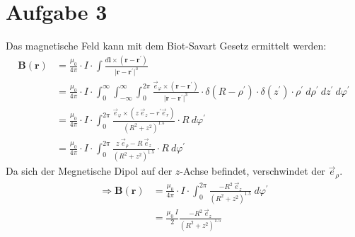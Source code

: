 \documentclass[11pt a4paper]{article}
\begin{document}
\newpage
\setlength{\headheight}{0cm}
\section*{Aufgabe 3}
Das magnetische Feld kann mit dem Biot-Savart Gesetz ermittelt werden:
\begin{align*}
	\mathbf B(\mathbf r) 
	&= \frac{\mu_0}{4\pi} \cdot I \cdot \int 
	\frac{d \mathbf{l} \times (\mathbf{r} - \mathbf{r^\prime})}
	{\vert \mathbf{r} - \mathbf{r^\prime} \vert^3} \\
	&= \frac{\mu_0}{4\pi} \cdot I \cdot 
	\int_0^\infty \int_{-\infty}^\infty \int_0^{2\pi}
	\frac{\vec e_\varphi \times 
	(\mathbf{r} - \mathbf{r^\prime})}
	{\vert \mathbf{r} - \mathbf{r^\prime} \vert^3} \cdot
	\delta(R - \rho^\prime) \cdot \delta(z^\prime) \cdot \rho^\prime
	\ d\rho^\prime \ dz^\prime \ d\varphi^\prime \\
	&= \frac{\mu_0}{4\pi} \cdot I \cdot 
	\int_0^{2\pi}
	\frac{ \vec e_\varphi \times 
	(z \ \vec e_z - r^\prime \vec e_r)}
	{\left( R^2 + z^2 \right)^{1.5} } \cdot
	R
	\ d\varphi^\prime \\
	&= \frac{\mu_0}{4\pi} \cdot I \cdot 
	\int_0^{2\pi}
	\frac{z \ \vec e_\rho - R \ \vec e_z}
	{\left( R^2 + z^2 \right)^{1.5} } \cdot
	R
	\ d\varphi^\prime
\end{align*}
Da sich der Megnetische Dipol auf der $z$-Achse befindet, verschwindet der
$\vec e_\rho$.
\begin{align*}
	\Rightarrow
	\mathbf B(\mathbf r) 
	&= \frac{\mu_0}{4\pi} \cdot I \cdot 
	\int_0^{2\pi}
	\frac{-R^2 \ \vec e_z}
	{\left( R^2 + z^2 \right)^{1.5} }
	\ d\varphi^\prime \\
	&= \frac{\mu_0 \ I}{2}
	\frac{-R^2 \ \vec e_z}
	{\left( R^2 + z^2 \right)^{1.5} }
\end{align*}
\end{document}
